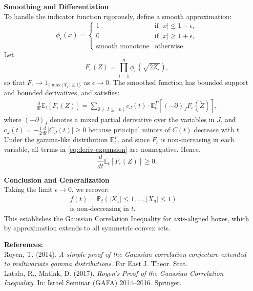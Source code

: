 \begin{technical}
\noindent\textbf{Smoothing and Differentiation}\\[0.5em]
To handle the indicator function rigorously, define a smooth approximation:
\[
\phi_\epsilon(x) = 
\begin{cases}
1 & \text{if } |x| \le 1 - \epsilon, \\
0 & \text{if } |x| \ge 1 + \epsilon, \\
\text{smooth monotone} & \text{otherwise}.
\end{cases}
\]
Let
\[
F_\epsilon(Z) = \prod_{i=1}^n \phi_\epsilon\left(\sqrt{2Z_i}\right),
\]
so that \( F_\epsilon \to 1_{\{\max |X_i| \le 1\}} \) as \( \epsilon \to 0 \). The smoothed function has bounded support and bounded derivatives, and satisfies:
\begin{align}
\frac{d}{dt} \mathbb{E}_t[F_\epsilon(Z)] 
= \sum_{\emptyset \neq J \subseteq [n]} c_J(t) \cdot \mathbb{E}^{\Gamma}_t \left[ (-\partial)_J F_\epsilon(\tilde Z) \right], \label{eq:deriv-expansion}
\end{align}
where \( (-\partial)_J \) denotes a mixed partial derivative over the variables in \( J \), and \( c_J(t) = -\frac{1}{2} \frac{d}{dt} |C_J(t)| \ge 0 \) because principal minors of \( C(t) \) decrease with \( t \). Under the gamma-like distribution \( \mathbb{E}^\Gamma_t \), and since \( F_\epsilon \) is non-increasing in each variable, all terms in \eqref{eq:deriv-expansion} are nonnegative. Hence,
\[
\frac{d}{dt} \mathbb{E}_t[F_\epsilon(Z)] \ge 0.
\]

\noindent\textbf{Conclusion and Generalization}\\[0.5em]
Taking the limit \( \epsilon \to 0 \), we recover:
\begin{align} 
f(t) = \mathbb{P}_t\left( |X_1| \le 1, \dots, |X_n| \le 1 \right) \quad \\\text{is non-decreasing in } t.
\end{align}
This establishes the Gaussian Correlation Inequality for axis-aligned boxes, which by approximation extends to all symmetric convex sets.

\vspace{0.5em}
\noindent\textbf{References:}\\
Royen, T. (2014). \textit{A simple proof of the Gaussian correlation conjecture extended to multivariate gamma distributions}. Far East J. Theor. Stat.\\
Latała, R., Matlak, D. (2017). \textit{Royen’s Proof of the Gaussian Correlation Inequality}. In: Israel Seminar (GAFA) 2014–2016. Springer.
\end{technical}
